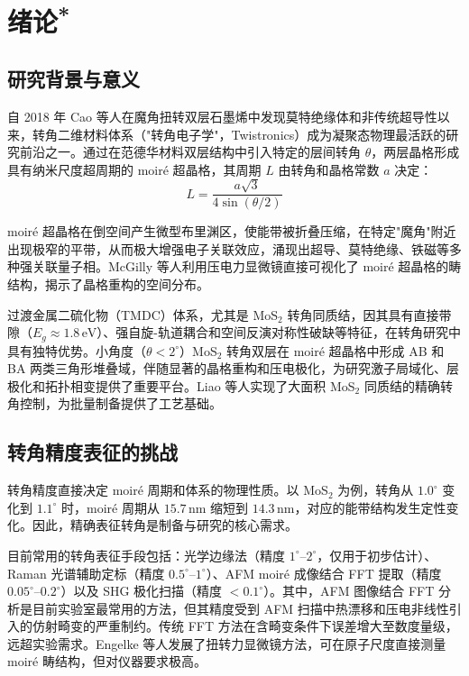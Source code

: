 \documentclass[supercite]{HustGraduPaper}
\begin{document}
\clearpage
{}

\section[绪论]{绪论\textsuperscript{*}}

\subsection{研究背景与意义}

自 2018 年 Cao 等人在魔角扭转双层石墨烯中发现莫特绝缘体和非传统超导性以来，转角二维材料体系（"转角电子学"，Twistronics）成为凝聚态物理最活跃的研究前沿之一\cite{cao2018unconventional}。通过在范德华材料双层结构中引入特定的层间转角 $\theta$，两层晶格形成具有纳米尺度超周期的 moiré 超晶格，其周期 $L$ 由转角和晶格常数 $a$ 决定：
\begin{equation}
  L = \frac{a\sqrt{3}}{4\sin(\theta/2)}
  \label{eq:moire_period}
\end{equation}

moiré 超晶格在倒空间产生微型布里渊区，使能带被折叠压缩，在特定"魔角"附近出现极窄的平带，从而极大增强电子关联效应，涌现出超导、莫特绝缘、铁磁等多种强关联量子相。McGilly 等人利用压电力显微镜直接可视化了 moiré 超晶格的畴结构，揭示了晶格重构的空间分布\cite{mcgilly2020visualization}。

过渡金属二硫化物（TMDC）体系，尤其是 MoS$_2$ 转角同质结，因其具有直接带隙（$E_g \approx 1.8\,\mathrm{eV}$）、强自旋-轨道耦合和空间反演对称性破缺等特征，在转角研究中具有独特优势。小角度（$\theta < 2^{\circ}$）MoS$_2$ 转角双层在 moiré 超晶格中形成 AB 和 BA 两类三角形堆叠域，伴随显著的晶格重构和压电极化\cite{weston2020atomic}，为研究激子局域化、层极化和拓扑相变提供了重要平台。Liao 等人实现了大面积 MoS$_2$ 同质结的精确转角控制，为批量制备提供了工艺基础\cite{liao2020precise}。

\subsection{转角精度表征的挑战}

转角精度直接决定 moiré 周期和体系的物理性质。以 MoS$_2$ 为例，转角从 $1.0^{\circ}$ 变化到 $1.1^{\circ}$ 时，moiré 周期从 $15.7\,\mathrm{nm}$ 缩短到 $14.3\,\mathrm{nm}$，对应的能带结构发生定性变化。因此，精确表征转角是制备与研究的核心需求。

目前常用的转角表征手段包括：光学边缘法（精度 $1^{\circ}$--$2^{\circ}$，仅用于初步估计）、Raman 光谱辅助定标（精度 $0.5^{\circ}$--$1^{\circ}$）、AFM moiré 成像结合 FFT 提取（精度 $0.05^{\circ}$--$0.2^{\circ}$）以及 SHG 极化扫描（精度 $< 0.1^{\circ}$）。其中，AFM 图像结合 FFT 分析是目前实验室最常用的方法，但其精度受到 AFM 扫描中热漂移和压电非线性引入的仿射畸变的严重制约。传统 FFT 方法在含畸变条件下误差增大至数度量级，远超实验需求。Engelke 等人发展了扭转力显微镜方法，可在原子尺度直接测量 moiré 畴结构，但对仪器要求极高\cite{engelke2024torsional}。
\end{document}
